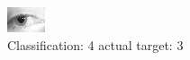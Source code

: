 \begin{figure}[h!]
\begin{center}
\includegraphics[width=0.60\columnwidth]{figures/ID1364_class_4_target_3.png}
\end{center}
\caption{ Classification: 4 actual target: 3}
\label{fig:ID1364_class_4_target_3}
\end{figure}
